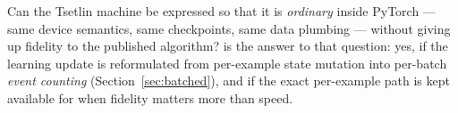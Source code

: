 \begin{ttcallout}
Can the Tsetlin machine be expressed so that it is \emph{ordinary} inside PyTorch --- same
device semantics, same checkpoints, same data plumbing --- without giving up fidelity to the
published algorithm? \ttlibname is the answer to that question: yes, if the learning update
is reformulated from per-example state mutation into per-batch \emph{event counting}
(Section~\ref{sec:batched}), and if the exact per-example path is kept available for when
fidelity matters more than speed.
\end{ttcallout}

